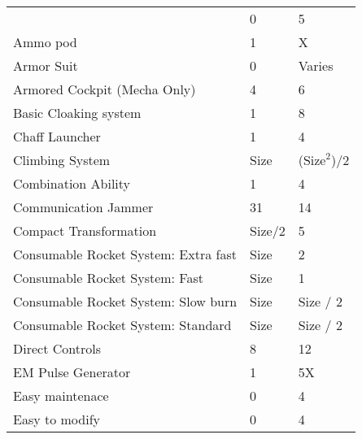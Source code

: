 \documentclass[twoside]{book}
\begin{document}
\begin{longtable}{p{1.25in}ll}
  &
   0 
  &
   5 
  \tabularnewline
      
  \raggedright
           Ammo pod 
  &
   1 
  &
   X 
  \tabularnewline
      
  \raggedright
           Armor Suit 
  &
   0 
  &
   Varies 
  \tabularnewline
      
  \raggedright
           Armored Cockpit (Mecha Only)
           
  &
   4 
  &
   6 
  \tabularnewline
      
  \raggedright
           Basic Cloaking system 
  &
   1 
  &
   8 
  \tabularnewline
      
  \raggedright
           Chaff Launcher 
  &
   1 
  &
   4 
  \tabularnewline
      
  \raggedright
           Climbing System 
  &
   Size 
  &
   (\begin{math}{\textrm{Size}}^{2}\end{math})/2 
  \tabularnewline
      
  \raggedright
           Combination Ability 
  &
   1 
  &
   4 
  \tabularnewline
      
  \raggedright
           Communication Jammer 
  &
   31 
  &
   14 
  \tabularnewline
      
  \raggedright
           Compact Transformation 
  &
   Size/2 
  &
   5 
  \tabularnewline
      
  \raggedright
           Consumable Rocket System: Extra
           fast 
  &
   Size 
  &
   2 
  \tabularnewline
      
  \raggedright
           Consumable Rocket System: Fast
           
  &
   Size 
  &
   1 
  \tabularnewline
      
  \raggedright
           Consumable Rocket System: Slow
           burn 
  &
   Size 
  &
   Size / 2 
  \tabularnewline
      
  \raggedright
           Consumable Rocket System:
           Standard 
  &
   Size 
  &
   Size / 2 
  \tabularnewline
      
  \raggedright
           Direct Controls 
  &
   8 
  &
   12 
  \tabularnewline
      
  \raggedright
           EM Pulse Generator 
  &
   1 
  &
   5X 
  \tabularnewline
      
  \raggedright
           Easy maintenace 
  &
   0 
  &
   4 
  \tabularnewline
      
  \raggedright
           Easy to modify 
  &
   0 
  &
   4 
  \tabularnewline
      

\end{longtable}
\end{document}
